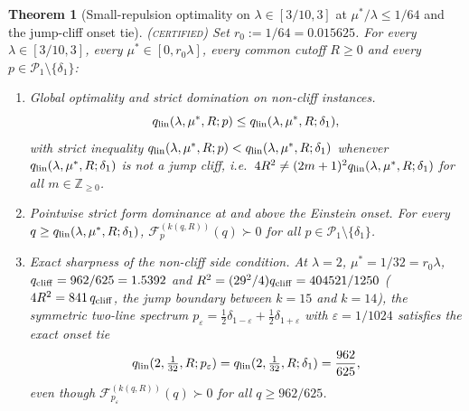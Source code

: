 \documentclass[11pt]{article}
\newcommand{\Fcal}{\mathcal F}
\newcommand{\muS}{\mu^{*}}
\newtheorem{theorem}{Theorem}[section]
\theoremstyle{definition}
\theoremstyle{remark}
\newcommand{\certified}{\textnormal{\textsc{(certified)}}}
\begin{document}
\begin{theorem}[Small-repulsion optimality on {$\lambda\in[3/10,3]$} at $\muS/\lambda\le1/64$
and the jump-cliff onset tie]\label{thm:smallr}\certified
Set $r_0:=1/64=0.015625$. For every $\lambda\in[3/10,3]$, every $\muS\in[0,r_0\lambda]$,
every common cutoff $R\ge0$ and every $p\in\mathcal P_1\setminus\{\delta_1\}$:
\begin{enumerate}[label=(\roman*),leftmargin=2.2em]
\item \emph{Global optimality and strict domination on non-cliff instances.}
\begin{equation}\label{eq:smallrdom}
q_{\rm lin}(\lambda,\muS,R;p)\le q_{\rm lin}(\lambda,\muS,R;\delta_1),
\end{equation}
with strict inequality $q_{\rm lin}(\lambda,\muS,R;p)<q_{\rm lin}(\lambda,\muS,R;\delta_1)$
whenever $q_{\rm lin}(\lambda,\muS,R;\delta_1)$ is not a jump cliff, i.e.\
$4R^2\ne(2m+1)^2q_{\rm lin}(\lambda,\muS,R;\delta_1)$ for all $m\in\mathbb Z_{\ge0}$.
\item \emph{Pointwise strict form dominance at and above the Einstein onset.}
For every $q\ge q_{\rm lin}(\lambda,\muS,R;\delta_1)$,
$\Fcal_p^{(k(q,R))}(q)\succ0$ for all $p\in\mathcal P_1\setminus\{\delta_1\}$.
\item \emph{Exact sharpness of the non-cliff side condition.} At $\lambda=2$,
$\muS=1/32=r_0\lambda$, $q_{\rm cliff}=962/625=1.5392$ and
$R^2=(29^2/4)q_{\rm cliff}=404521/1250$ ($4R^2=841\,q_{\rm cliff}$, the jump boundary
between $k=15$ and $k=14$), the symmetric two-line spectrum
$p_\varepsilon=\frac12\delta_{1-\varepsilon}+\frac12\delta_{1+\varepsilon}$ with
$\varepsilon=1/1024$ satisfies the exact onset tie
\begin{equation}\label{eq:clifftie}
q_{\rm lin}(2,\tfrac{1}{32},R;p_\varepsilon)
=q_{\rm lin}(2,\tfrac{1}{32},R;\delta_1)=\frac{962}{625},
\end{equation}
even though $\Fcal_{p_\varepsilon}^{(k(q,R))}(q)\succ0$ for all $q\ge962/625$.
\end{enumerate}
\end{theorem}
\end{document}
